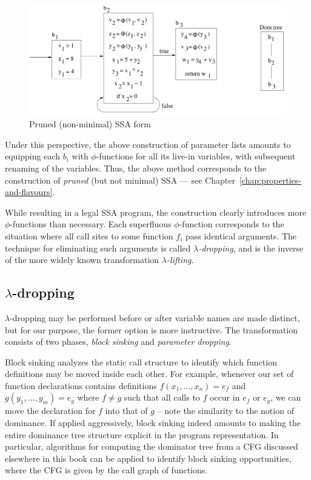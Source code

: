\begin{figure}
\begin{center}
\includegraphics[scale=0.4]{SSAConstructionExample2}
\end{center}
\caption{\label{fig:FunctionalCorrespondenceRunningExampleInitialSSA} Pruned (non-minimal) SSA form}
\end{figure}

Under this perspective, the above construction of parameter lists
amounts to equipping each $b_i$ with $\phi$-functions for all its
live-in variables, with subsequent renaming of the variables. Thus,
the above method corresponds to the construction of \emph{pruned} (but
not minimal) SSA --- see Chapter~\ref{chap:properties-and-flavours}.

While resulting in a legal SSA program, the construction clearly
introduces more $\phi$-functions than necessary. Each superfluous
$\phi$-function corresponds to the situation where all call sites to
some function $f_i$ pass identical arguments. The technique for
eliminating such arguments is called
\emph{$\lambda$-dropping}, and is
the inverse of the more widely known transformation
\emph{$\lambda$-lifting}. 

\subsection{$\lambda$-dropping}
\label{section:Part1:Semantics:lambdaDropping}

$\lambda$-dropping may be performed before or after variable names are
made distinct, but for our purpose, the former option is more
instructive.  The transformation consists of two phases, \emph{block
sinking} and \emph{parameter dropping}.

Block sinking analyzes the static call structure to identify which
function definitions may be moved inside each other. For example,
whenever our set of function declarations contains definitions $f
(x_1,\ldots,x_n) = e_f$ and $ g (y_1,\ldots,y_m) = e_g$ where $f \neq
g$ such that all calls to $f$ occur in $e_f$ or $e_g$, we can move the
declaration for $f$ into that of $g$ -- note the similarity to the
notion of dominance. If applied aggressively, block sinking indeed
amounts to making the entire dominance tree structure explicit in the
program representation. In particular, algorithms for computing the
dominator tree from a CFG discussed elsewhere in this book can be
applied to identify block sinking opportunities, where the CFG is
given by the call graph of functions.

